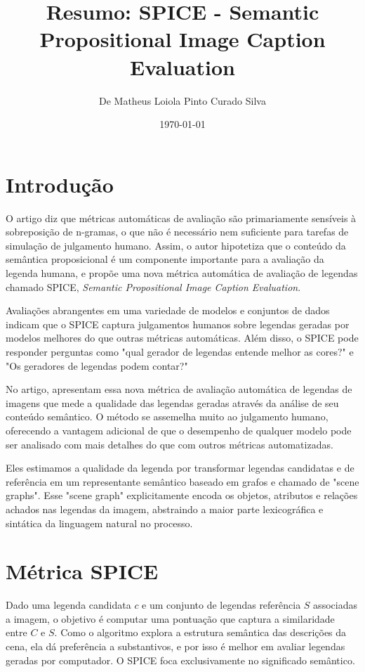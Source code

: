 \documentclass[12pt]{article}
\title{Resumo: SPICE -  Semantic Propositional Image Caption Evaluation}
\author{De Matheus Loiola Pinto Curado Silva}
\date{\today}
\begin{document}
	
\maketitle

\section*{Introdução}

O artigo diz que métricas automáticas de avaliação são primariamente sensíveis à sobreposição de n-gramas, o que não é necessário nem suficiente para tarefas de simulação de julgamento humano. Assim, o autor hipotetiza que o conteúdo da semântica proposicional é um componente importante para a avaliação da legenda humana, e propõe uma nova métrica automática de avaliação de legendas chamado SPICE, \textit{Semantic Propositional Image Caption Evaluation}.

Avaliações abrangentes em uma variedade de modelos e conjuntos de dados indicam que o SPICE captura julgamentos humanos sobre legendas geradas por modelos melhores do que outras métricas automáticas. Além disso, o SPICE pode responder perguntas como "qual gerador de legendas entende melhor as cores?" e "Os geradores de legendas podem contar?"

No artigo, apresentam essa nova métrica de avaliação automática de legendas de imagens que mede a qualidade das legendas geradas através da análise de seu conteúdo semântico. O método se assemelha muito ao julgamento humano, oferecendo a vantagem adicional de que o desempenho de qualquer modelo pode ser analisado com mais detalhes do que com outros métricas automatizadas.

Eles estimamos a qualidade da legenda por transformar legendas candidatas e de referência em um representante semântico baseado em grafos e chamado de "scene graphs". Esse "scene graph" explicitamente encoda os objetos, atributos e relações achados nas legendas da imagem, abstraindo a maior parte lexicográfica e sintática da linguagem natural no processo.

\section*{Métrica SPICE}

Dado uma legenda candidata $c$ e um conjunto de legendas referência $S$ associadas a imagem, o objetivo é computar uma pontuação que captura a similaridade entre $C$ e $S$. Como o algoritmo explora a estrutura semântica das descrições da cena, ela dá preferência a substantivos, e por isso é melhor em avaliar legendas geradas por computador. O SPICE foca exclusivamente no significado semântico.
\end{document}
